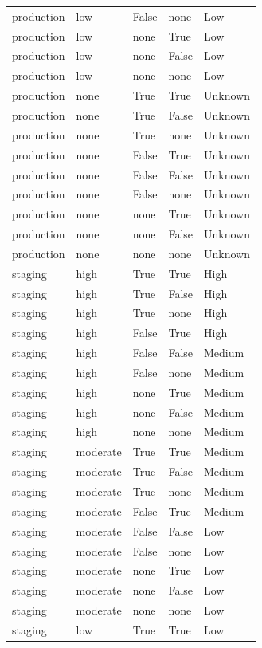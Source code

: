 \begin{longtable}{@{}lllll@{}}
production & low & False & none & Low \\
production & low & none & True & Low \\
production & low & none & False & Low \\
production & low & none & none & Low \\
production & none & True & True & Unknown \\
production & none & True & False & Unknown \\
production & none & True & none & Unknown \\
production & none & False & True & Unknown \\
production & none & False & False & Unknown \\
production & none & False & none & Unknown \\
production & none & none & True & Unknown \\
production & none & none & False & Unknown \\
production & none & none & none & Unknown \\
staging & high & True & True & High \\
staging & high & True & False & High \\
staging & high & True & none & High \\
staging & high & False & True & High \\
staging & high & False & False & Medium \\
staging & high & False & none & Medium \\
staging & high & none & True & Medium \\
staging & high & none & False & Medium \\
staging & high & none & none & Medium \\
staging & moderate & True & True & Medium \\
staging & moderate & True & False & Medium \\
staging & moderate & True & none & Medium \\
staging & moderate & False & True & Medium \\
staging & moderate & False & False & Low \\
staging & moderate & False & none & Low \\
staging & moderate & none & True & Low \\
staging & moderate & none & False & Low \\
staging & moderate & none & none & Low \\
staging & low & True & True & Low \\

\end{longtable}
